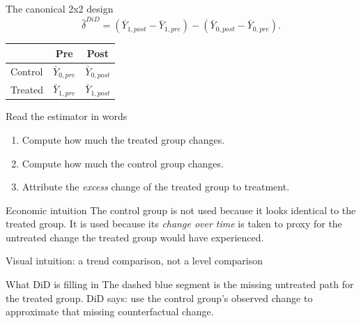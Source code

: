 \documentclass[10pt]{beamer}
\begin{document}
\begin{frame}{The canonical 2x2 design}
\label{slide:did_2x2}
\small
\[
\hat{\delta}^{DiD}
=
(\bar{Y}_{1,post}-\bar{Y}_{1,pre})-(\bar{Y}_{0,post}-\bar{Y}_{0,pre}).
\]

\begin{table}
\centering
\begin{tabular}{lcc}
\toprule
& Pre & Post \\
\midrule
Control & $\bar{Y}_{0,pre}$ & $\bar{Y}_{0,post}$ \\
Treated & $\bar{Y}_{1,pre}$ & $\bar{Y}_{1,post}$ \\
\bottomrule
\end{tabular}
\end{table}

\begin{block}{Read the estimator in words}
\begin{enumerate}
  \item Compute how much the treated group changes.
  \item Compute how much the control group changes.
  \item Attribute the \emph{excess} change of the treated group to treatment.
\end{enumerate}
\end{block}

\begin{exampleblock}{Economic intuition}
The control group is not used because it looks identical to the treated group. It is used because its \emph{change over time} is taken to proxy for the untreated change the treated group would have experienced.
\end{exampleblock}

\hfill\hyperlink{app:did-reg}{}
\end{frame}

\begin{frame}{Visual intuition: a trend comparison, not a level comparison}
\label{slide:did_plot}
\centering
{}

\vspace{0.5em}
\begin{block}{What DiD is filling in}
The dashed blue segment is the missing untreated path for the treated group. DiD says: use the control group's observed change to approximate that missing counterfactual change.
\end{block}
\end{frame}
\end{document}
